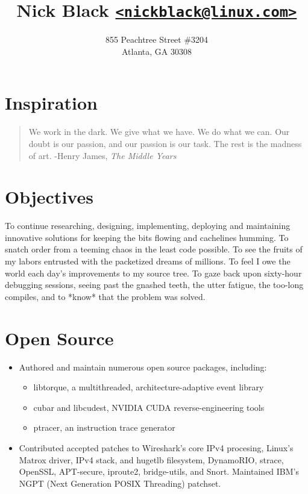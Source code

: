 \documentclass[11pt]{article}
\title{\small Nick Black \href{mailto:nickblack@linux.com}{\nolinkurl{<nickblack@linux.com>}}}
\author{\tiny 855 Peachtree Street \#3204\\
\tiny Atlanta, GA 30308}
\date{}
\newenvironment{tightitemize}
{\begin{itemize}
  \setlength{\itemsep}{1pt}
  \setlength{\parskip}{0pt}
  \setlength{\parsep}{0pt}}
{\end{itemize}}
\begin{document}
\maketitle

\section{Inspiration}
\begin{quote}
We work in the dark. We give what we have. We do what we can.
Our doubt is our passion, and our passion is our task.
The rest is the madness of art. -Henry James, \textit{The Middle Years}
\end{quote}

\section{Objectives}
To continue researching, designing, implementing, deploying and maintaining
innovative solutions for keeping the bits flowing and cachelines humming.
To snatch order from a teeming chaos in the least code possible. To see the
fruits of my labors entrusted with the packetized dreams of millions. To feel I
owe the world each day's improvements to my source tree. To gaze back upon
sixty-hour debugging sessions, seeing past the gnashed teeth, the utter
fatigue, the too-long compiles, and to *know* that the problem was solved.

\section{Open Source}
\begin{tightitemize}
\item Authored and maintain numerous open source packages, including:
\begin{tightitemize}
\item libtorque, a multithreaded, architecture-adaptive event library
\item cubar and libcudest, NVIDIA CUDA reverse-engineering tools
\item ptracer, an instruction trace generator
\end{tightitemize}
\item Contributed accepted patches to Wireshark's core IPv4 procesing, Linux's
  Matrox driver, IPv4 stack, and hugetlb filesystem, DynamoRIO,
  strace, OpenSSL, APT-secure, iproute2, bridge-utils, and Snort.
  Maintained IBM's NGPT (Next Generation POSIX Threading) patchset.
\end{tightitemize}
\end{document}
